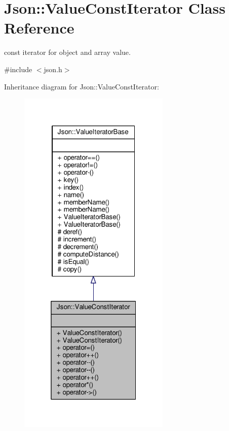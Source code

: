 \hypertarget{classJson_1_1ValueConstIterator}{}\section{Json\+:\+:Value\+Const\+Iterator Class Reference}
\label{classJson_1_1ValueConstIterator}


const iterator for object and array value.  




{\ttfamily \#include $<$json.\+h$>$}



Inheritance diagram for Json\+:\+:Value\+Const\+Iterator\+:
\nopagebreak
\begin{figure}[H]
\begin{center}
\leavevmode
\includegraphics[width=205pt]{d8/dea/classJson_1_1ValueConstIterator__inherit__graph}
\end{center}
\end{figure}


